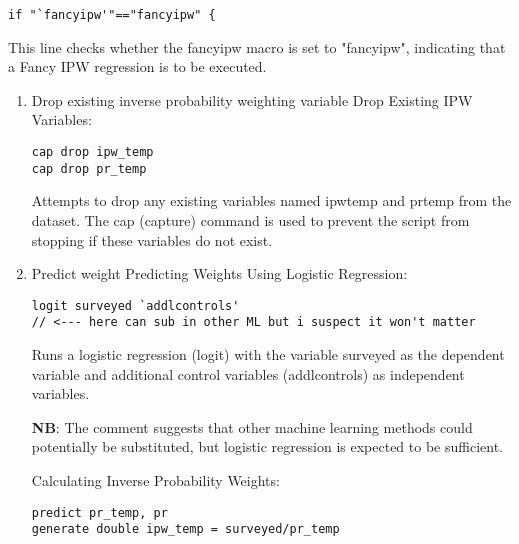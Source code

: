 \documentclass{article}
\begin{document}
\begin{mdframed}
\begin{verbatim}
if "`fancyipw'"=="fancyipw" {
\end{verbatim}
\end{mdframed}

\vspace{0.3cm}This line checks whether the fancyipw macro is set to "fancyipw", indicating that a Fancy IPW regression is to be executed.

\begin{enumerate}
    \item Drop existing inverse probability weighting variable \newline
Drop Existing IPW Variables:
\begin{mdframed}
\begin{verbatim}
cap drop ipw_temp
cap drop pr_temp
\end{verbatim}
\end{mdframed}

\vspace{0.2cm}Attempts to drop any existing variables named ipwtemp and prtemp from the dataset. The cap (capture) command is used to prevent the script from stopping if these variables do not exist.

\item Predict weight \newline
Predicting Weights Using Logistic Regression:
\begin{mdframed}
\begin{verbatim}
logit surveyed `addlcontrols' 
// <--- here can sub in other ML but i suspect it won't matter
\end{verbatim}
\end{mdframed}

Runs a logistic regression (logit) with the variable surveyed as the dependent variable and additional control variables (addlcontrols) as independent variables.\newline 

\textbf{NB}: The comment suggests that other machine learning methods could potentially be substituted, but logistic regression is expected to be sufficient.\newline

Calculating Inverse Probability Weights:

\begin{mdframed}
\begin{verbatim}
predict pr_temp, pr
generate double ipw_temp = surveyed/pr_temp
\end{verbatim}
\end{mdframed}


\end{enumerate}
\end{document}
